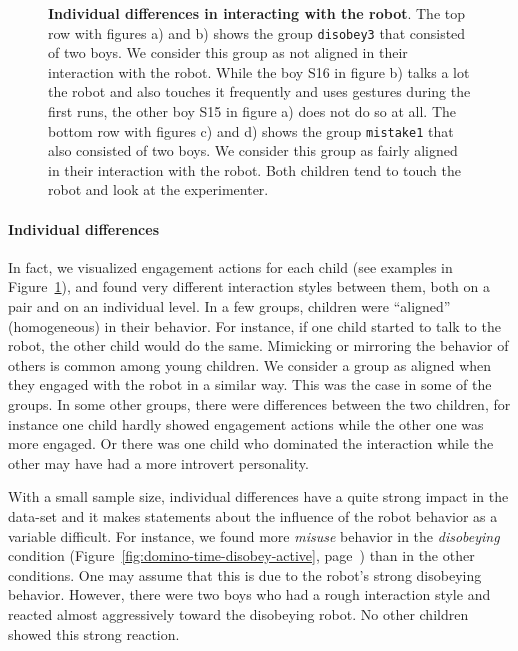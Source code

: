 \documentclass{sig-alternate}
\begin{document}
\begin{figure}[!h]
    \caption[Individual Differences in Interacting with the Robot]{\small
        \textbf{Individual differences in interacting with the robot}. The top row
        with figures a) and b) shows the group \texttt{disobey3} that consisted of two
        boys. We consider this group as not aligned in their interaction with the
        robot. While the boy S16 in figure b) talks a lot the robot and also touches
        it frequently and uses gestures during the first runs, the other boy S15 in
        figure a) does not do so at all. The bottom row with figures c) and d) shows
        the group \texttt{mistake1} that also consisted of two boys. We consider this
        group as fairly aligned in their interaction with the robot. Both children
        tend to touch the robot and look at the experimenter.}

    \label{fig:domino-individual-differences}
\end{figure}	


\paragraph{Individual differences}	

In fact, we visualized engagement actions for each child (see examples in
Figure~\ref{fig:domino-individual-differences}), and found very different
interaction styles between them, both on a pair and on an individual level. In a
few groups, children were ``aligned'' (homogeneous) in their behavior. For
instance, if one child started to talk to the robot, the other child would do
the same. Mimicking or mirroring the behavior of others is common among young
children. We consider a group as aligned when they engaged with the robot in a
similar way. This was the case in some of the groups. In some other groups,
there were differences between the two children, for instance one child hardly
showed engagement actions while the other one was more engaged. Or there was one
child who dominated the interaction while the other may have had a more
introvert personality.

With a small sample size, individual differences have a quite strong impact in
the data-set and it makes statements about the influence of the robot behavior
as a variable difficult. For instance, we found more \textit{misuse} behavior in
the \textit{disobeying} condition (Figure~\ref{fig:domino-time-disobey-active},
page~\pageref{fig:domino-time-disobey-active}) than in the other conditions. One
may assume that this is due to the robot's strong disobeying behavior. However,
there were two boys who had a rough interaction style and reacted almost
aggressively toward the disobeying robot. No other children showed this strong
reaction.
\end{document}
